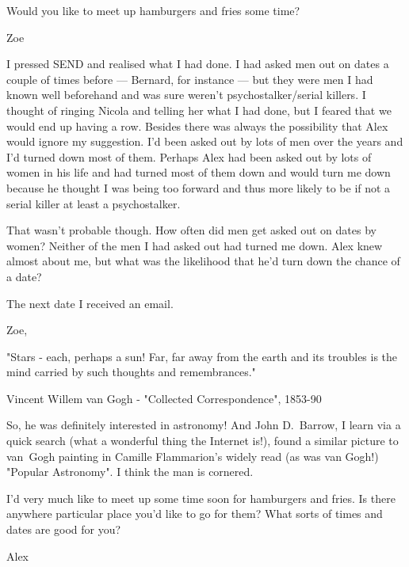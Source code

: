 Would you like to meet up hamburgers and fries some time?

Zoe
\stopmessage

I pressed {\twelvess SEND\/} and realised what I had done. I had
asked men out on dates a couple of times before --- Bernard, for
instance --- but they were men I had known well beforehand and was
sure weren't psychostalker/serial killers. I thought of ringing
Nicola and telling her what I had done, but I feared that we would
end up having a row. Besides there was always the possibility that
Alex would ignore my suggestion. I'd been asked out by lots of men
over the years and I'd turned down most of them. Perhaps Alex had been
asked out by lots of women in his life and had turned most of them
down and would turn me down because he thought I was being too
forward and thus more likely to be if not a serial killer at least a
psychostalker.

That wasn't probable though. How often did men get asked out on
dates by women? Neither of the men I had asked out had turned me
down. Alex knew almost about me, but what was the likelihood that he'd turn down the chance of a date?

The next date I received an email.

\startmessage
Zoe,

"Stars - each, perhaps a sun! Far, far away from the earth and its
troubles is the mind carried by such thoughts and remembrances."

Vincent Willem van Gogh - "Collected Correspondence", 1853-90

So, he was definitely interested in astronomy! And John D.~Barrow, I
learn via a quick search (what a wonderful thing the Internet is!), found a
similar picture to van~Gogh painting in Camille Flammarion's widely
read (as was van Gogh!) "Popular Astronomy". I think the man is
cornered.

I'd very much like to meet up some time soon for hamburgers and
fries. Is there anywhere particular place you'd like to go for them?
What sorts of times and dates are good for you?

Alex
\stopmessage

